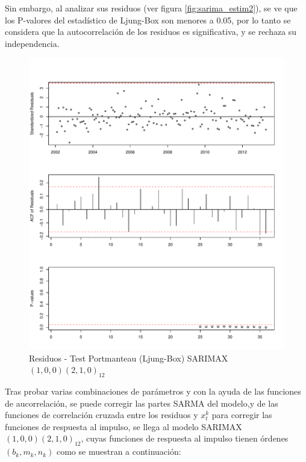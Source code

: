 \documentclass[12pt,oneside]{book}\usepackage[]{graphicx}\usepackage[]{color}
\makeatletter
\def\maxwidth{ %
  \ifdim\Gin@nat@width>\linewidth
    \linewidth
  \else
    \Gin@nat@width
  \fi
}
\newenvironment{knitrout}{}{} %
\theoremstyle{definition} %
\makeatother
\begin{document}
Sin embargo, al analizar sus residuos (ver figura \ref{fig:sarima_estim2}), se ve que los P-valores del estadístico de Ljung-Box son menores a 0.05, por lo tanto se considera que la autocorrelación de los residuos es significativa, y se rechaza su independencia.

\begin{knitrout}
\color{fgcolor}\begin{figure}[h]

{\centering \includegraphics[width=\maxwidth]{figure/unnamed-chunk-54-1} 

}

\caption{\label{fig:sarima_estim2} Residuos - Test Portmanteau (Ljung-Box) SARIMAX $(1,0,0)(2,1,0)_{12}$}\label{fig:unnamed-chunk-54}
\end{figure}


\end{knitrout}






Tras probar varias combinaciones de parámetros y con la ayuda de las funciones de aucorrelación, se puede corregir las partes SARMA del modelo,y de las funciones de correlación cruzada entre los residuos y $x_t^{k}$ para corregir las funciones de respuesta al impulso, se llega al modelo SARIMAX $(1,0,0)(2,1,0)_{12}$, cuyas funciones de respuesta al impulso tienen órdenes $(b_k,m_k,n_k)$ como se muestran a continuación:
\end{document}
